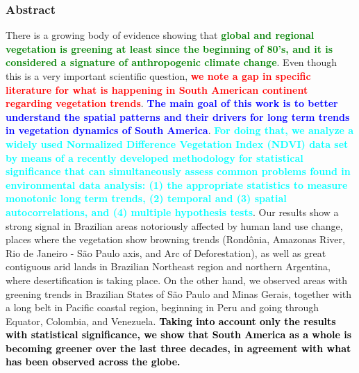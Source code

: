 \documentclass[11pt]{beamer}
\begin{document}
\begin{frame}[fragile]
  \frametitle{\normalsize{\textbf{
    Abstract
  }}} 

  \scriptsize{  

    There is a growing body of evidence showing that \textbf{\textcolor{green}{
    global and regional vegetation is greening at least since the beginning of 
    80’s, and it is considered a signature of anthropogenic climate change}}. 
    Even though this is a very important scientific question, 
    \textbf{\textcolor{red}{we note a gap in specific literature for what is 
    happening in South American continent regarding vegetation trends}}. 
    \textbf{\textcolor{blue}{The main goal of this work is to better understand 
    the spatial patterns and their drivers for long term trends in vegetation 
    dynamics of South America}}. \textbf{\textcolor{cyan}{For doing that, 
    we analyze a widely used Normalized Difference Vegetation Index (NDVI) 
    data set by means of a recently developed methodology for statistical 
    significance that can simultaneously assess common problems found in 
    environmental data analysis: (1) the appropriate statistics to measure 
    monotonic long term trends, (2) temporal and (3) spatial autocorrelations, 
    and (4) multiple hypothesis tests}}. Our results show a strong signal in 
    Brazilian areas notoriously affected by human land use change, places where 
    the vegetation show browning trends (Rondônia, Amazonas River, Rio de Janeiro
     - São Paulo axis, and Arc of Deforestation), as well as great contiguous 
    arid lands in Brazilian Northeast region and northern Argentina, where 
    desertification is taking place. On the other hand, we observed areas with 
    greening trends in Brazilian States of São Paulo and Minas Gerais, 
    together with a long belt in Pacific coastal region, beginning in Peru
    and going through Equator, Colombia, and Venezuela. \textbf{\textcolor{black}{
    Taking into account only the results with statistical significance, we show 
    that South America as a whole is becoming greener over the last three 
    decades, in agreement with what has been observed across the globe.}}

  }
\end{frame}
\end{document}
